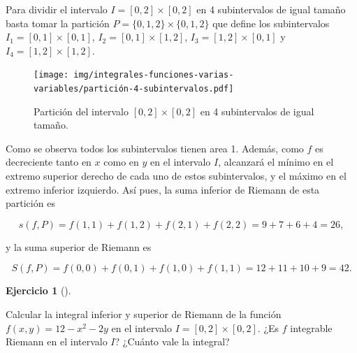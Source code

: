 \documentclass[
  a4paper,
]{scrreport}
\theoremstyle{definition}
\newtheorem{exercise}{Ejercicio}[chapter]
\theoremstyle{remark}
\begin{document}
\begin{tcolorbox}[enhanced jigsaw, rightrule=.15mm, opacityback=0, bottomtitle=1mm, titlerule=0mm, toprule=.15mm, breakable, colframe=quarto-callout-tip-color-frame, left=2mm, opacitybacktitle=0.6, title=\textcolor{quarto-callout-tip-color}{\faLightbulb}\hspace{0.5em}{Solución}, toptitle=1mm, colback=white, colbacktitle=quarto-callout-tip-color!10!white, arc=.35mm, bottomrule=.15mm, coltitle=black, leftrule=.75mm]

Para dividir el intervalo \(I=[0,2]\times[0,2]\) en 4 subintervalos de
igual tamaño basta tomar la partición \(P=\{0,1,2\}\times\{0,1,2\}\) que
define los subintervalos \(I_1=[0,1]\times [0,1]\),
\(I_2=[0,1]\times [1,2]\), \(I_3=[1,2]\times [0,1]\) y
\(I_4=[1,2]\times [1,2]\).

\begin{figure}[H]

{\centering \texttt{[image: img/integrales-funciones-varias-variables/partición-4-subintervalos.pdf]}

}

\caption{Partición del intervalo \([0,2]\times [0,2]\) en 4
subintervalos de igual tamaño.}

\end{figure}

Como se observa todos los subintervalos tienen area 1. Además, como
\(f\) es decreciente tanto en \(x\) como en \(y\) en el intervalo \(I\),
alcanzará el mínimo en el extremo superior derecho de cada uno de estos
subintervalos, y el máximo en el extremo inferior izquierdo. Así pues,
la suma inferior de Riemann de esta partición es

\[
s(f,P) 
= f(1,1) + f(1,2) + f(2,1) + f(2,2)
= 9 + 7 + 6 + 4
= 26,
\]

y la suma superior de Riemann es

\[
S(f,P) 
= f(0,0) + f(0,1) + f(1,0) + f(1,1)
= 12 + 11 + 10 + 9 
= 42.
\]

\end{tcolorbox}

\begin{exercise}[]\protect\hypertarget{exr-integral-inferior-superior-riemann-n-dimensional}{}\label{exr-integral-inferior-superior-riemann-n-dimensional}

Calcular la integral inferior y superior de Riemann de la función
\(f(x,y)=12-x^2-2y\) en el intervalo \(I=[0,2]\times[0,2]\). ¿Es \(f\)
integrable Riemann en el intervalo \(I\)? ¿Cuánto vale la integral?

\end{exercise}
\end{document}
